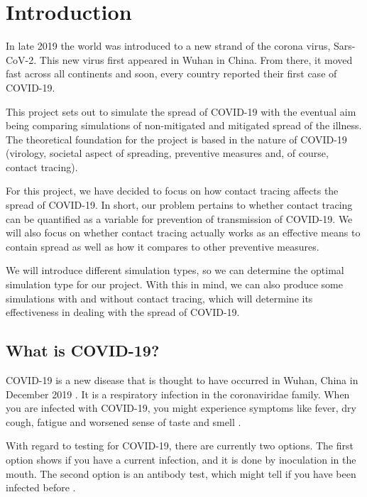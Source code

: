 \chapter{Introduction} \label{chap:introduction}


In late 2019 the world was introduced to a new strand of the corona virus, Sars-CoV-2. This new virus first appeared in Wuhan in China. From there, it moved fast across all continents and soon, every country reported their first case of COVID-19.

This project sets out to simulate the spread of COVID-19 with the eventual aim being comparing simulations of non-mitigated and mitigated spread of the illness. The theoretical foundation for the project is based in the nature of COVID-19 (virology, societal aspect of spreading, preventive measures and, of course, contact tracing).

For this project, we have decided to focus on how contact tracing affects the spread of COVID-19. In short, our problem pertains to whether contact tracing can be quantified as a variable for prevention of transmission of COVID-19. We will also focus on whether contact tracing actually works as an effective means to contain spread as well as how it compares to other preventive measures. 

We will introduce different simulation types, so we can determine the optimal simulation type for our project. With this in mind, we can also produce some simulations with and without contact tracing, which will determine its effectiveness in dealing with the spread of COVID-19.

\section{What is COVID-19?}
COVID-19 is a new disease that is thought to have occurred in Wuhan, China in December 2019 \citep{gorbalenya_severe_2020}. It is a respiratory infection in the coronaviridae family. When you are infected with COVID-19, you might experience symptoms like fever, dry cough, fatigue and worsened sense of taste and smell \citep{ssi_statens_nodate}.

With regard to testing for COVID-19, there are currently two options. The first option shows if you have a current infection, and it is done by inoculation in the mouth. The second option is an antibody test, which might tell if you have been infected before \citep{cdc_coronavirus_2020}.

